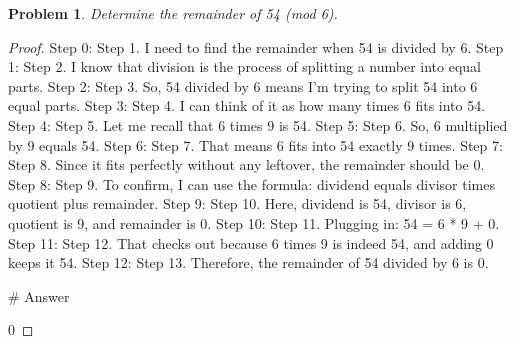 \documentclass{article}
\newtheorem{theorem}{Problem}
\begin{document}
\begin{theorem}
Determine the remainder of 54 (mod 6).
\end{theorem}

\begin{proof}
Step 0: Step 1. I need to find the remainder when 54 is divided by 6.
Step 1: Step 2. I know that division is the process of splitting a number into equal parts.
Step 2: Step 3. So, 54 divided by 6 means I'm trying to split 54 into 6 equal parts.
Step 3: Step 4. I can think of it as how many times 6 fits into 54.
Step 4: Step 5. Let me recall that 6 times 9 is 54.
Step 5: Step 6. So, 6 multiplied by 9 equals 54.
Step 6: Step 7. That means 6 fits into 54 exactly 9 times.
Step 7: Step 8. Since it fits perfectly without any leftover, the remainder should be 0.
Step 8: Step 9. To confirm, I can use the formula: dividend equals divisor times quotient plus remainder.
Step 9: Step 10. Here, dividend is 54, divisor is 6, quotient is 9, and remainder is 0.
Step 10: Step 11. Plugging in: 54 = 6 * 9 + 0.
Step 11: Step 12. That checks out because 6 times 9 is indeed 54, and adding 0 keeps it 54.
Step 12: Step 13. Therefore, the remainder of 54 divided by 6 is 0.

        # Answer

        0
\end{proof}
\end{document}
